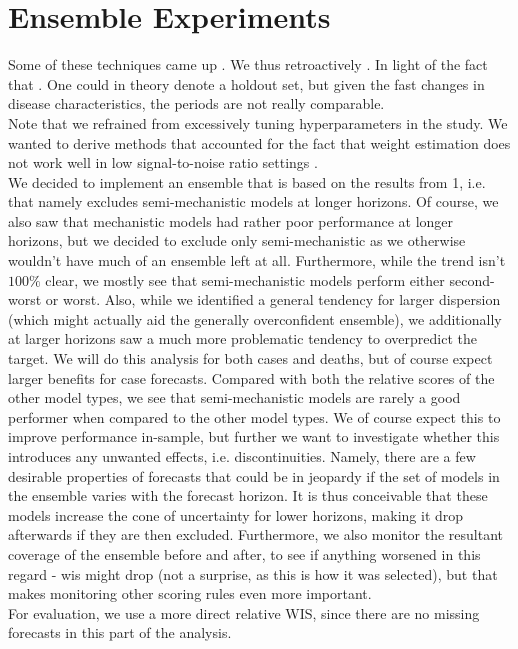 \section{Ensemble Experiments}
Some of these techniques came up . We thus retroactively . In light of the fact that . One could in theory denote a holdout set, but given the fast changes in disease characteristics, the periods are not really comparable.\\ 
Note that we refrained from excessively tuning hyperparameters in the study.
We wanted to derive methods that accounted for the fact that weight estimation does not work well in low signal-to-noise ratio settings \cite{claeskens_forecast_2016}.\\
We decided to implement an ensemble that is based on the results from 1, i.e. that namely excludes semi-mechanistic models at longer horizons. Of course, we also saw that mechanistic models had rather poor performance at longer horizons, but we decided to exclude only semi-mechanistic as we otherwise wouldn't have much of an ensemble left at all. Furthermore, while the trend isn't $100\%$ clear, we mostly see that semi-mechanistic models perform either second-worst or worst. Also, while we identified a general tendency for larger dispersion (which might actually aid the generally overconfident ensemble), we additionally at larger horizons saw a much more problematic tendency to overpredict the target. We will do this analysis for both cases and deaths, but of course expect larger benefits for case forecasts. Compared with both the relative scores of the other model types, we see that semi-mechanistic models are rarely a good performer when compared to the other model types.  We of course expect this to improve performance in-sample, but further we want to investigate whether this introduces any unwanted effects, i.e. discontinuities. Namely, there are a few desirable properties of forecasts that could be in jeopardy if the set of models in the ensemble varies with the forecast horizon. It is thus conceivable that these models increase the cone of uncertainty for lower horizons, making it drop afterwards if they are then excluded. Furthermore, we also monitor the resultant coverage of the ensemble before and after, to see if anything worsened in this regard - wis might drop (not a surprise, as this is how it was selected), but that makes monitoring other scoring rules even more important. \\
For evaluation, we use a more direct relative WIS, since there are no missing forecasts in this part of the analysis.\\
